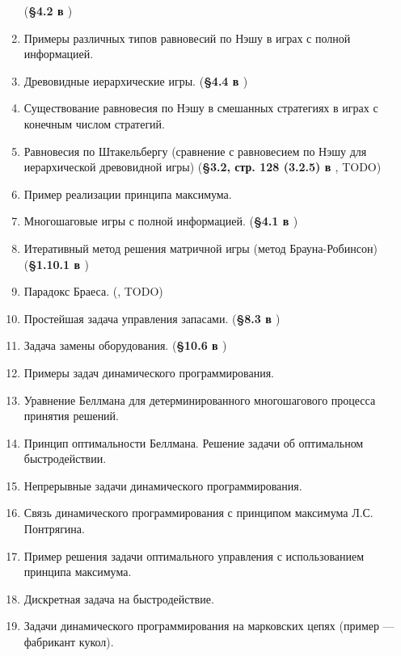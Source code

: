 \documentclass[a4paper,14pt]{extarticle}
\begin{document}
\begin{enumerate}
        (\textbf{\S 4.2 в \cite{gametheory-2012}})
    \item Примеры различных типов равновесий по Нэшу в играх с полной информацией.
    \item Древовидные иерархические игры.
        (\textbf{\S 4.4 в \cite{gametheory-2012}})
    \item Существование равновесия по Нэшу в смешанных стратегиях в играх с конечным числом стратегий.
    \item Равновесия по Штакельбергу (сравнение с равновесием по Нэшу для иерархической древовидной игры)
        (\textbf{\S 3.2, стр. 128 (3.2.5) в \cite{gametheory-2012}}, TODO)
    \item Пример реализации принципа максимума.
    \item Многошаговые игры с полной информацией.
        (\textbf{\S 4.1 в \cite{gametheory-2012}})
    \item Итеративный метод решения матричной игры (метод Брауна-Робинсон)
        (\textbf{\S 1.10.1 в \cite{gametheory-2012}})
    \item Парадокс Браеса.
        (\textbf{\cite{wiki-braess-ru}}, TODO) %
    \item Простейшая задача управления запасами.
        (\textbf{\S 8.3 в \cite{vagner-2-1983}})
    \item Задача замены оборудования.
        (\textbf{\S 10.6 в \cite{vagner-2-1983}})
    \item Примеры задач динамического программирования.
    \item Уравнение Беллмана для детерминированного многошагового процесса принятия решений.
    \item Принцип оптимальности Беллмана. Решение задачи об оптимальном быстродействии.
    \item Непрерывные задачи динамического программирования.
    \item Связь динамического программирования с принципом максимума Л.С. Понтрягина.
    \item Пример решения задачи оптимального управления с использованием принципа максимума.
    \item Дискретная задача на быстродействие.
    \item Задачи динамического программирования на марковских цепях (пример --- фабрикант кукол).
\end{enumerate}

\custombibliography
\end{document}
